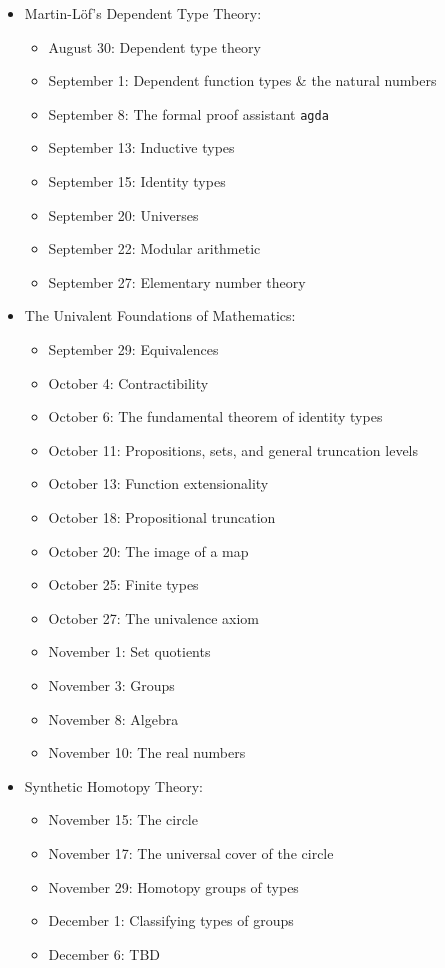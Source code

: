 \documentclass{amsart}
\theoremstyle{definition}
\theoremstyle{remark}
\numberwithin{equation}{section}
\begin{document}
\begin{itemize}
\item {Martin-L\"of's Dependent Type Theory:}
\begin{itemize}
\item {August 30: Dependent type theory}
\item {September 1: Dependent function types \& the natural numbers}
\item {September 8: The formal proof assistant \texttt{agda}}
\item {September 13: Inductive types}
\item {September 15: Identity types}
\item {September 20: Universes}
\item {September 22: Modular arithmetic}
\item {September 27: Elementary number theory}
\end{itemize}
\item {The Univalent Foundations of Mathematics:}
\begin{itemize}
\item {September 29: Equivalences}
\item {October 4: Contractibility}
\item {October 6: The fundamental theorem of identity types}
\item {October 11: Propositions, sets, and general truncation levels}
\item {October 13: Function extensionality}
\item {October 18: Propositional truncation}
\item {October 20: The image of a map}
\item {October 25: Finite types}
\item {October 27: The univalence axiom}
\item {November 1: Set quotients}
\item {November 3: Groups}
\item {November 8: Algebra}
\item {November 10: The real numbers}
\end{itemize}
\item {Synthetic Homotopy Theory:}
\begin{itemize}
\item {November 15: The circle}
\item {November 17: The universal cover of the circle}
\item {November 29: Homotopy groups of types}
\item {December 1: Classifying types of groups}
\item {December 6: TBD}
\end{itemize}
\end{itemize}

 
\end{document}
